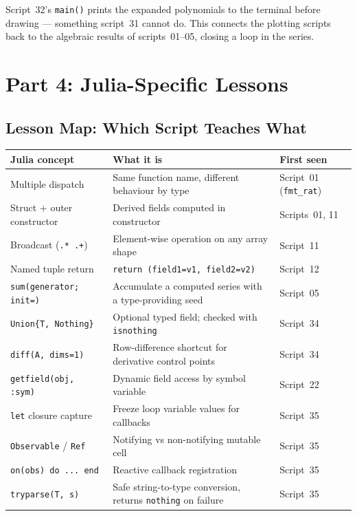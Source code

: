 \documentclass[12pt, a4paper]{article}
\newcommand{\cd}[1]{\texttt{#1}}
\begin{document}
Script~32's \cd{main()} prints the expanded polynomials
to the terminal before drawing --- something script~31
cannot do.
This connects the plotting scripts back to the algebraic
results of scripts~01--05, closing a loop in the series.


\section{Part 4: Julia-Specific Lessons}

\subsection{Lesson Map: Which Script Teaches What}

\begin{center}
\renewcommand{\arraystretch}{1.3}
\begin{tabular}{lp{5cm}l}
\toprule
Julia concept & What it is & First seen \\
\midrule
Multiple dispatch &
  Same function name, different behaviour by type &
  Script~01 (\cd{fmt\_rat}) \\
Struct + outer constructor &
  Derived fields computed in constructor &
  Scripts~01, 11 \\
Broadcast (\cd{.* .+}) &
  Element-wise operation on any array shape &
  Script~11 \\
Named tuple return &
  \cd{return (field1=v1, field2=v2)} &
  Script~12 \\
\cd{sum(generator; init=)} &
  Accumulate a computed series with a type-providing seed &
  Script~05 \\
\cd{Union\{T, Nothing\}} &
  Optional typed field; checked with \cd{isnothing} &
  Script~34 \\
\cd{diff(A, dims=1)} &
  Row-difference shortcut for derivative control points &
  Script~34 \\
\cd{getfield(obj, :sym)} &
  Dynamic field access by symbol variable &
  Script~22 \\
\cd{let} closure capture &
  Freeze loop variable values for callbacks &
  Script~35 \\
\cd{Observable} / \cd{Ref} &
  Notifying vs non-notifying mutable cell &
  Script~35 \\
\cd{on(obs) do ... end} &
  Reactive callback registration &
  Script~35 \\
\cd{tryparse(T, s)} &
  Safe string-to-type conversion, returns \cd{nothing} on failure &
  Script~35 \\
\bottomrule
\end{tabular}
\end{center}
\end{document}
